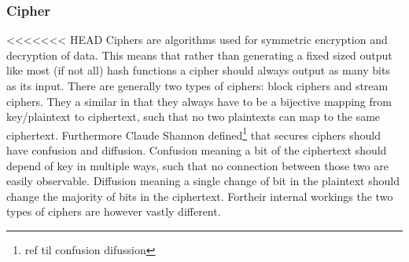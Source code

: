 \documentclass[a4paper]{article}
\begin{document}
\subsubsection{Cipher}
<<<<<<< HEAD
\label{sec:orgb38e82a}
Ciphers are algorithms used for symmetric encryption and decryption of data. This means that rather than generating a fixed sized output like most (if not all) hash functions a cipher should always output as many bits as its input. There are generally two types of ciphers: block ciphers and stream ciphers. They a similar in that they always have to be a bijective mapping from key/plaintext to ciphertext, such that no two plaintexts can map to the same ciphertext. Furthermore Claude Shannon defined\footnote{ref til confusion difussion} that secures ciphers should have confusion and diffusion. Confusion meaning a bit of the ciphertext should depend of key in multiple ways, such that no connection between those two are easily observable. Diffusion meaning a single change of bit in the plaintext should change the majority of bits in the ciphertext. Fortheir internal workings the two types of ciphers are however vastly different.
\end{document}
